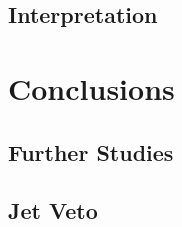 \documentclass[10pt,twoside,cucitura,classica,english,openany]{toptesi}
\begin{document}


\section{Interpretation}
\label{sec:interpretation}



\chapter{Conclusions}
\label{cha:conclusions}



\begin{appendices}
  \chapter{Further Studies}

  \section{Jet Veto }
  \label{sec:jet-veto}

  
\end{appendices}

\printglossaries

 \printbibliography
\end{document}
